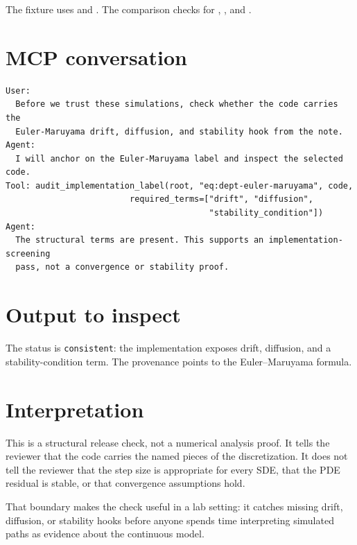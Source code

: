 \documentclass[12pt,a4paper,openany]{book}
\begin{document}
The fixture uses  and
. The comparison checks
 for , , and
.

\section*{MCP conversation}

\begin{lstlisting}[basicstyle=\ttfamily\scriptsize]
User:
  Before we trust these simulations, check whether the code carries the
  Euler-Maruyama drift, diffusion, and stability hook from the note.
Agent:
  I will anchor on the Euler-Maruyama label and inspect the selected code.
Tool: audit_implementation_label(root, "eq:dept-euler-maruyama", code,
                         required_terms=["drift", "diffusion",
                                         "stability_condition"])
Agent:
  The structural terms are present. This supports an implementation-screening
  pass, not a convergence or stability proof.
\end{lstlisting}



\section*{Output to inspect}

The status is \texttt{consistent}: the implementation exposes drift, diffusion, and a
stability-condition term. The provenance points to the Euler--Maruyama formula.

\section*{Interpretation}

This is a structural release check, not a numerical analysis proof. It tells the
reviewer that the code carries the named pieces of the discretization. It does
not tell the reviewer that the step size is appropriate for every SDE, that the
PDE residual is stable, or that convergence assumptions hold.

That boundary makes the check useful in a lab setting: it catches missing drift,
diffusion, or stability hooks before anyone spends time interpreting simulated
paths as evidence about the continuous model.
\end{document}
